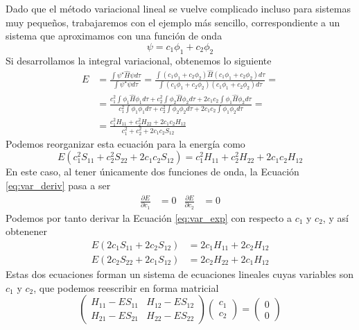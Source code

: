 \documentclass{tufte-handout}
\begin{document}
Dado que el método variacional lineal se vuelve complicado
incluso para sistemas muy pequeños, trabajaremos con el ejemplo
más sencillo, correspondiente a un sistema que aproximamos
con una función de onda 
\begin{equation}
    \psi=c_1\phi_1 + c_2\phi_2
\end{equation}
Si desarrollamos la integral variacional, obtenemos lo siguiente
\begin{equation}
\begin{split}
    E&=\frac{\int\psi^\star\hat{H}\psi d\tau}{\int\psi^\star\psi d\tau}  
    = \frac{\int( c_1\phi_1+ c_2\phi_2)\hat{H}(c_1\phi_1+ c_2\phi_2)d\tau}{\int (c_1\phi_1+ c_2\phi_2)(c_1\phi_ 1+ c_2\phi_2)d\tau}= \\
    &= \frac{c_1^2\int\phi_1\hat{H}\phi_1 d\tau +
    c_2^2\int\phi_2\hat{H}\phi_2 d\tau  +
    2c_1c_2\int\phi_1\hat{H}\phi_2 d\tau}
    {c_1^2\int\phi_1\phi_1 d\tau  +
    c_2^2\int\phi_2\phi_2 d\tau  +
    2c_1c_2\int\phi_1\phi_2 d\tau} = \\
    & = \frac{c_1^2H_{11} + c_2^2H_{22} + 2c_1c_2H_{12}}
    {c_1^2 + c_2^2 + 2c_1c_2S_{12}}
    \end{split}
\end{equation}
Podemos reorganizar esta ecuación para la energía como
\begin{equation}
    E(c_1^2S_{11} + c_2^2S_{22} + 2c_1c_2S_{12})=c_1^2H_{11} + c_2^2H_{22} + 2c_1c_2H_{12}
    \label{eq:var_exp}
\end{equation}
En este caso, al tener únicamente dos funciones de onda, 
la Ecuación \ref{eq:var_deriv} pasa a ser
\begin{align}
    \frac{\partial E}{\partial c_1}&=0       & \frac{\partial E}{\partial c_2}&=0
\end{align}
Podemos por tanto derivar la Ecuación \ref{eq:var_exp}
con respecto a $c_1$ y $c_2$, y así obtenener
\begin{align}
 E(2c_1S_{11} +2c_2S_{12})    &=2c_1H_{11} +2c_2H_{12} \label{eq:seq1}\\
 E(2c_2S_{22} +2c_1S_{12})    &=2c_2H_{22} +2c_1H_{12}
 \label{eq:seq2}
\end{align}
Estas dos ecuaciones forman un sistema de ecuaciones 
lineales cuyas variables son $c_1$ y $c_2$, que 
podemos reescribir en forma matricial
\begin{equation}
\begin{pmatrix}
 H_{11}-ES_{11} &  H_{12}-ES_{12}  \\ 
 H_{21}-ES_{21} &  H_{22}-ES_{22}
\end{pmatrix}
\begin{pmatrix}
c_{1}  \\ 
c_{2}
\end{pmatrix}=
\begin{pmatrix}
0\\
0
\end{pmatrix}
\end{equation}
\end{document}
